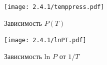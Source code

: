 \documentclass[a4paper,12pt]{article} %
\begin{document}
\begin{figure}[h]
    \centering
    \texttt{[image: 2.4.1/temppress.pdf]}
    \caption{Зависимость $P(T)$}
    \label{fig:temppress}
\end{figure}

\begin{figure}[h]
    \centering
    \texttt{[image: 2.4.1/lnPT.pdf]}
    \caption{Зависимость ln $P$ от $1/T$}
    \label{fig:temppressnorm}
\end{figure}
\end{document}
